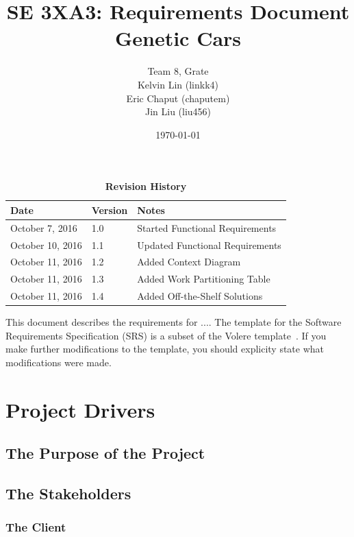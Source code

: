 \documentclass[12pt, titlepage]{article}
\title{SE 3XA3: Requirements Document\\Genetic Cars}
\author{Team 8, Grate
		\\ Kelvin Lin (linkk4)
		\\ Eric Chaput (chaputem)
		\\ Jin Liu (liu456)
}
\date{\today}
\begin{document}
\maketitle

\tableofcontents
\listoftables
\listoffigures

\begin{table}[h]
\caption{\bf Revision History}
\begin{tabularx}{\textwidth}{p{3.5cm}p{2cm}X}
\toprule {\bf Date} & {\bf Version} & {\bf Notes}\\
\midrule
October 7, 2016 & 1.0 & Started Functional Requirements\\
October 10, 2016 & 1.1 & Updated Functional Requirements\\
October 11, 2016 & 1.2 & Added Context Diagram\\
October 11, 2016 & 1.3 & Added Work Partitioning Table\\
October 11, 2016 & 1.4 & Added Off-the-Shelf Solutions\\
\bottomrule
\end{tabularx}
\end{table}

\newpage


This document describes the requirements for ....  The template for the Software
Requirements Specification (SRS) is a subset of the Volere
template~\citep{RobertsonAndRobertson2012}.  If you make further modifications
to the template, you should explicity state what modifications were made.

\section{Project Drivers}

\subsection{The Purpose of the Project}

\subsection{The Stakeholders}

\subsubsection{The Client}
\end{document}
